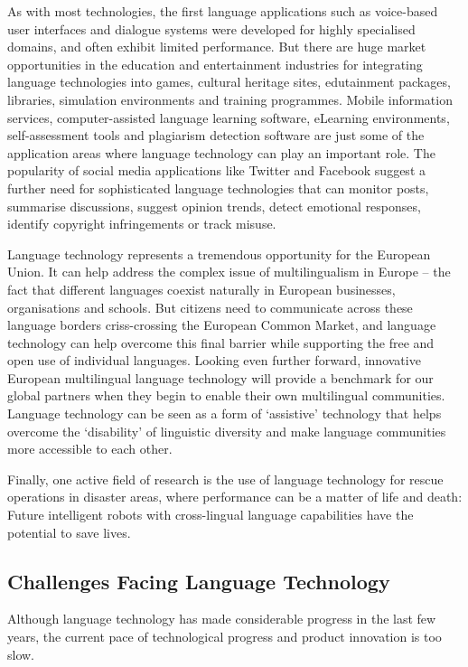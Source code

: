 \begin{multicols}{2}
    As with most technologies, the first language applications such as voice-based user interfaces and dialogue systems were developed for highly specialised domains, and often exhibit limited performance. But there are huge market opportunities in the education and entertainment industries for integrating language technologies into games, cultural heritage sites, edutainment packages, libraries, simulation environments and training programmes. Mobile information services, computer-assisted language learning software, eLearning environments, self-assessment tools and plagiarism detection software are just some of the application areas where language technology can play an important role. The popularity of social media applications like Twitter and Facebook suggest a further need for sophisticated language technologies that can monitor posts, summarise discussions, suggest opinion trends, detect emotional responses, identify copyright infringements or track misuse.
    

    Language technology represents a tremendous opportunity for the European Union. It can help address the complex issue of multilingualism in Europe – the fact that different languages coexist naturally in European businesses, organisations and schools. But citizens need to communicate across these language borders criss-crossing the European Common Market, and language technology can help overcome this final barrier while supporting the free and open use of individual languages. Looking even further forward, innovative European multilingual language technology will provide a benchmark for our global partners when they begin to enable their own multilingual communities. Language technology can be seen as a form of ‘assistive’ technology that helps overcome the ‘disability’ of linguistic diversity and make language communities more accessible to each other.

    Finally, one active field of research is the use of language technology for rescue operations in disaster areas, where performance can be a matter of life and death: Future intelligent robots with cross-lingual language capabilities have the potential to save lives.

\subsection{Challenges Facing Language Technology}
    Although language technology has made considerable progress in the last few years, the current pace of technological progress and product innovation is too slow. 


\end{multicols}
